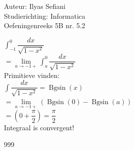 \documentclass[a4paper]{article}
\newcommand{\dint}{\displaystyle\int}
\begin{document}
\noindent \large Auteur: Ilyas Sefiani \\
\noindent \large Studierichting: Informatica\\
\noindent \large Oefeningenreeks 5B nr. 5.2\\

\medskip

\normalsize

$\dint_{-1}^{0} \dfrac{dx}{\sqrt{1-x^2}}$\\

$= \lim\limits_{a \rightarrow -1+} \dint_{a}^{0} \dfrac{dx}{\sqrt{1-x^2}}$\\

Primitieve vinden:\\

$\displaystyle\int \dfrac{dx}{\sqrt{1-x^2}} = \operatorname{Bgsin}{(x)}$\\

$= \lim\limits_{a \rightarrow -1+} \left(\operatorname{Bgsin}{(0)}-\operatorname{Bgsin}{(a)}\right)$\\

$= \left(0 + \dfrac{\pi}{2} \right) = \dfrac{\pi}{2}$\\

Integraal is convergent!\\

\begin{thebibliography}{999}
\end{thebibliography}
\end{document}
